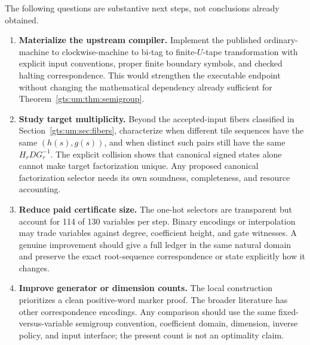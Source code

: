 \documentclass[11pt,letterpaper]{article}
\theoremstyle{definition}
\theoremstyle{remark}
\begin{document}
The following questions are substantive next steps, not conclusions already obtained.
\begin{enumerate}
\item \textbf{Materialize the upstream compiler.} Implement the published ordinary-machine to clockwise-machine to bi-tag to finite-$U$-tape transformation with explicit input conventions, proper finite boundary symbols, and checked halting correspondence. This would strengthen the executable endpoint without changing the mathematical dependency already sufficient for Theorem~\ref{gts:um:thm:semigroup}.
\item \textbf{Study target multiplicity.} Beyond the accepted-input fibers classified in Section~\ref{gts:um:sec:fibers}, characterize when different tile sequences have the same $(h(s),g(s))$, and when distinct such pairs still have the same $H_rDG_r^{-1}$. The explicit collision shows that canonical signed states alone cannot make target factorization unique. Any proposed canonical factorization selector needs its own soundness, completeness, and resource accounting.
\item \textbf{Reduce paid certificate size.} The one-hot selectors are transparent but account for 114 of 130 variables per step. Binary encodings or interpolation may trade variables against degree, coefficient height, and gate witnesses. A genuine improvement should give a full ledger in the same natural domain and preserve the exact root-sequence correspondence or state explicitly how it changes.
\item \textbf{Improve generator or dimension counts.} The local construction prioritizes a clean positive-word marker proof. The broader literature has other correspondence encodings. Any comparison should use the same fixed-versus-variable semigroup convention, coefficient domain, dimension, inverse policy, and input interface; the present count is not an optimality claim.


\end{enumerate}
\end{document}
